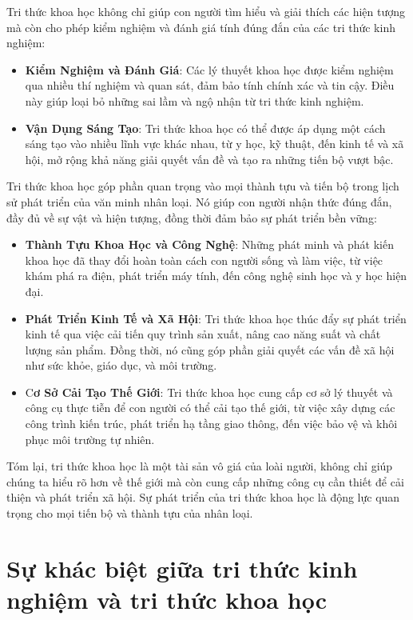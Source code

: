 Tri thức khoa học không chỉ giúp con người tìm hiểu và giải thích các hiện tượng mà còn cho phép kiểm nghiệm và đánh giá tính đúng đắn của các tri thức kinh nghiệm:
\begin{itemize}
    \item \textbf{Kiểm Nghiệm và Đánh Giá}: Các lý thuyết khoa học được kiểm nghiệm qua nhiều thí nghiệm và quan sát, đảm bảo tính chính xác và tin cậy. Điều này giúp loại bỏ những sai lầm và ngộ nhận từ tri thức kinh nghiệm.
    \item \textbf{Vận Dụng Sáng Tạo}: Tri thức khoa học có thể được áp dụng một cách sáng tạo vào nhiều lĩnh vực khác nhau, từ y học, kỹ thuật, đến kinh tế và xã hội, mở rộng khả năng giải quyết vấn đề và tạo ra những tiến bộ vượt bậc.
\end{itemize}

Tri thức khoa học góp phần quan trọng vào mọi thành tựu và tiến bộ trong lịch sử phát triển của văn minh nhân loại. Nó giúp con người nhận thức đúng đắn, đầy đủ về sự vật và hiện tượng, đồng thời đảm bảo sự phát triển bền vững:
\begin{itemize}
    \item \textbf{Thành Tựu Khoa Học và Công Nghệ}: Những phát minh và phát kiến khoa học đã thay đổi hoàn toàn cách con người sống và làm việc, từ việc khám phá ra điện, phát triển máy tính, đến công nghệ sinh học và y học hiện đại.
    \item \textbf{Phát Triển Kinh Tế và Xã Hội}: Tri thức khoa học thúc đẩy sự phát triển kinh tế qua việc cải tiến quy trình sản xuất, nâng cao năng suất và chất lượng sản phẩm. Đồng thời, nó cũng góp phần giải quyết các vấn đề xã hội như sức khỏe, giáo dục, và môi trường.
    \item C\textbf{ơ Sở Cải Tạo Thế Giới}: Tri thức khoa học cung cấp cơ sở lý thuyết và công cụ thực tiễn để con người có thể cải tạo thế giới, từ việc xây dựng các công trình kiến trúc, phát triển hạ tầng giao thông, đến việc bảo vệ và khôi phục môi trường tự nhiên.
\end{itemize}

Tóm lại, tri thức khoa học là một tài sản vô giá của loài người, không chỉ giúp chúng ta hiểu rõ hơn về thế giới mà còn cung cấp những công cụ cần thiết để cải thiện và phát triển xã hội. Sự phát triển của tri thức khoa học là động lực quan trọng cho mọi tiến bộ và thành tựu của nhân loại.

\section{Sự khác biệt giữa tri thức kinh nghiệm và tri thức khoa học}

